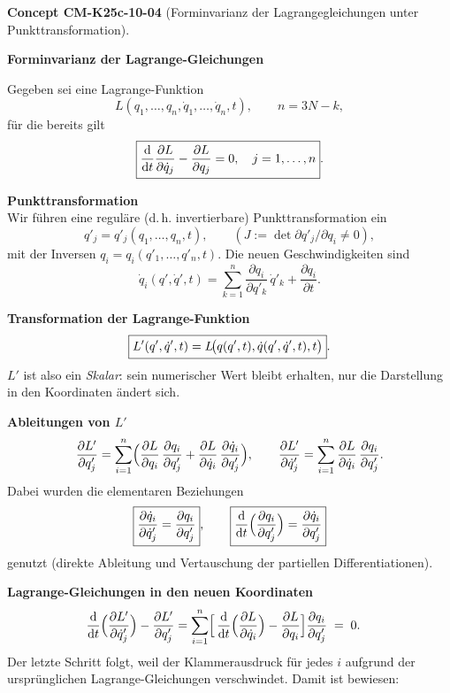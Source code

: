 \documentclass[10pt, letterpaper]{article}
\newcommand{\CustomHeading}[3]{%
  \par\medskip\noindent%
  \textbf{#1 #2} \textnormal{(#3)}.\enskip%
}
\newenvironment{CONC}[2]{\begin{unitbox}\CustomHeading{Concept}{#1}{#2}}{\end{unitbox}}
\begin{document}
\begin{CONC}{CM-K25c-10-04}{Forminvarianz der Lagrangegleichungen unter Punkttransformation}
\textbf{Forminvarianz der Lagrange-Gleichungen}

Gegeben sei eine Lagrange-Funktion
\[
  L(q_1,\dots,q_n,\dot q_1,\dots,\dot q_n,t),
  \qquad
  n = 3N-k ,
\]
für die bereits gilt
\[
  \boxed{%
    \frac{\mathrm d}{\mathrm dt}\frac{\partial L}{\partial\dot q_j}
    -\frac{\partial L}{\partial q_j}=0,
    \quad j=1,\dots,n }.
\]

\textbf{Punkttransformation}\\
Wir führen eine reguläre (d.\,h. invertierbare) Punkttransformation ein  
\[
  q'_j = q'_j(q_1,\dots,q_n,t),
  \qquad
  (J:=\det{\partial q'_j/\partial q_i}\neq0),
\]
mit der Inversen
\( q_i = q_i(q'_1,\dots,q'_n,t) \).
Die neuen Geschwindigkeiten sind
\[
  \dot q_i(q',\dot q',t)
  =\sum_{k=1}^{n}\frac{\partial q_i}{\partial q'_k}\,\dot q'_k
   +\frac{\partial q_i}{\partial t}.
\]

\textbf{Transformation der Lagrange-Funktion}\\
\[
  \boxed{%
    L'(q',\dot q',t)
    =L\!\bigl(q(q',t),\dot q(q',\dot q',t),t\bigr)}.
\]
$L'$ ist also ein \emph{Skalar}: sein numerischer Wert bleibt erhalten,
nur die Darstellung in den Koordinaten ändert sich.

\textbf{Ableitungen von $L'$}
\[
  \frac{\partial L'}{\partial q'_j}
  =\sum_{i=1}^{n}\Bigl(
      \frac{\partial L}{\partial q_i}\,
      \frac{\partial q_i}{\partial q'_j}
     +\frac{\partial L}{\partial\dot q_i}\,
      \frac{\partial\dot q_i}{\partial q'_j}\Bigr),\qquad
  \frac{\partial L'}{\partial\dot q'_j}
  =\sum_{i=1}^{n}
      \frac{\partial L}{\partial\dot q_i}\,
      \frac{\partial q_i}{\partial q'_j}.
\]
Dabei wurden die elementaren Beziehungen
\[
  \boxed{%
    \frac{\partial\dot q_i}{\partial\dot q'_j}=
    \frac{\partial q_i}{\partial q'_j}},
  \qquad
  \boxed{%
    \frac{\mathrm d}{\mathrm dt}
    \Bigl(\frac{\partial q_i}{\partial q'_j}\Bigr)=
    \frac{\partial\dot q_i}{\partial q'_j}}
\]
genutzt (direkte Ableitung und Vertauschung der partiellen Differentiationen).

\textbf{Lagrange-Gleichungen in den neuen Koordinaten}
\[
\begin{aligned}
  \frac{\mathrm d}{\mathrm dt}
    \Bigl(\frac{\partial L'}{\partial\dot q'_j}\Bigr)
  -\frac{\partial L'}{\partial q'_j}
  &=
  \sum_{i=1}^{n}
    \Bigl[\,
      \frac{\mathrm d}{\mathrm dt}
        \Bigl(\frac{\partial L}{\partial\dot q_i}\Bigr)
      -\frac{\partial L}{\partial q_i}\Bigr]
    \frac{\partial q_i}{\partial q'_j}\;=\;0 .
\end{aligned}
\]
Der letzte Schritt folgt, weil der Klammerausdruck für jedes
$i$ aufgrund der ursprünglichen Lagrange-Gleichungen verschwindet.
Damit ist bewiesen:


\end{CONC}
\end{document}
